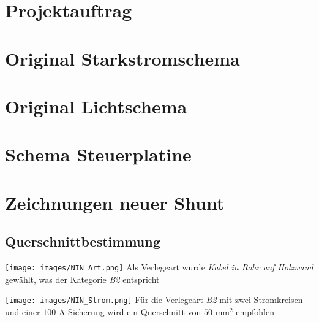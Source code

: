 \chapter{Projektauftrag}

%

%

\chapter{Original Starkstromschema}\label{schema_original}


\chapter{Original Lichtschema}\label{app:licht}


\chapter{Schema Steuerplatine}\label{Anh_Steuerplatine}



\chapter{Zeichnungen neuer Shunt}\label{app:2d}




\begin{landscape}
\chapter{Querschnittbestimmung}\label{app:nin}
\begin{minipage}{0.35\textwidth}
		\texttt{[image: images/NIN\_Art.png]}
	Als Verlegeart wurde \textit{Kabel in Rohr auf Holzwand} gewählt, was der Kategorie \textit{B2} entspricht \cite{NIN}
\end{minipage}
\begin{minipage}{0.1\textwidth}
\hspace{2cm}
\end{minipage}
\begin{minipage}{0.55\textwidth}
		\texttt{[image: images/NIN\_Strom.png]}
	Für die Verlegeart \textit{B2} mit zwei Stromkreisen und einer $100$ A Sicherung wird ein Querschnitt von $50$ mm$^2$ empfohlen \cite{NIN}
\end{minipage}
\end{landscape}